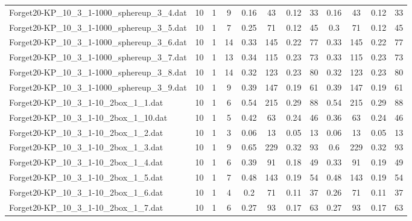 \begin{sidewaystable}[!ht]
{\begin{tabular}{lccccccccccc}
Forget20-KP\_10\_3\_1-1000\_sphereup\_3\_4.dat & 10 & 1 & 9 & 0.16 & 43 &  \textcolor{blue2}{0.12} & 33 & 0.16 & 43 &  \textcolor{blue2}{0.12} & 33 \\
Forget20-KP\_10\_3\_1-1000\_sphereup\_3\_5.dat & 10 & 1 & 7 & 0.25 & 71 &  \textcolor{blue2}{0.12} & 45 & 0.3 & 71 &  \textcolor{blue2}{0.12} & 45 \\
Forget20-KP\_10\_3\_1-1000\_sphereup\_3\_6.dat & 10 & 1 & 14 & 0.33 & 145 &  \textcolor{blue2}{0.22} & 77 & 0.33 & 145 &  \textcolor{blue2}{0.22} & 77 \\
Forget20-KP\_10\_3\_1-1000\_sphereup\_3\_7.dat & 10 & 1 & 13 & 0.34 & 115 &  \textcolor{blue2}{0.23} & 73 & 0.33 & 115 &  \textcolor{blue2}{0.23} & 73 \\
Forget20-KP\_10\_3\_1-1000\_sphereup\_3\_8.dat & 10 & 1 & 14 & 0.32 & 123 &  \textcolor{blue2}{0.23} & 80 & 0.32 & 123 &  \textcolor{blue2}{0.23} & 80 \\
Forget20-KP\_10\_3\_1-1000\_sphereup\_3\_9.dat & 10 & 1 & 9 & 0.39 & 147 &  \textcolor{blue2}{0.19} & 61 & 0.39 & 147 &  \textcolor{blue2}{0.19} & 61 \\
Forget20-KP\_10\_3\_1-10\_2box\_1\_1.dat & 10 & 1 & 6 & 0.54 & 215 &  \textcolor{blue2}{0.29} & 88 & 0.54 & 215 &  \textcolor{blue2}{0.29} & 88 \\
Forget20-KP\_10\_3\_1-10\_2box\_1\_10.dat & 10 & 1 & 5 & 0.42 & 63 &  \textcolor{blue2}{0.24} & 46 & 0.36 & 63 &  \textcolor{blue2}{0.24} & 46 \\
Forget20-KP\_10\_3\_1-10\_2box\_1\_2.dat & 10 & 1 & 3 & 0.06 & 13 &  \textcolor{blue2}{0.05} & 13 & 0.06 & 13 &  \textcolor{blue2}{0.05} & 13 \\
Forget20-KP\_10\_3\_1-10\_2box\_1\_3.dat & 10 & 1 & 9 & 0.65 & 229 &  \textcolor{blue2}{0.32} & 93 & 0.6 & 229 &  \textcolor{blue2}{0.32} & 93 \\
Forget20-KP\_10\_3\_1-10\_2box\_1\_4.dat & 10 & 1 & 6 & 0.39 & 91 &  \textcolor{blue2}{0.18} & 49 & 0.33 & 91 & 0.19 & 49 \\
Forget20-KP\_10\_3\_1-10\_2box\_1\_5.dat & 10 & 1 & 7 & 0.48 & 143 &  \textcolor{blue2}{0.19} & 54 & 0.48 & 143 &  \textcolor{blue2}{0.19} & 54 \\
Forget20-KP\_10\_3\_1-10\_2box\_1\_6.dat & 10 & 1 & 4 & 0.2 & 71 &  \textcolor{blue2}{0.11} & 37 & 0.26 & 71 &  \textcolor{blue2}{0.11} & 37 \\
Forget20-KP\_10\_3\_1-10\_2box\_1\_7.dat & 10 & 1 & 6 & 0.27 & 93 &  \textcolor{blue2}{0.17} & 63 & 0.27 & 93 &  \textcolor{blue2}{0.17} & 63 \\

\end{tabular}}
\end{sidewaystable}
